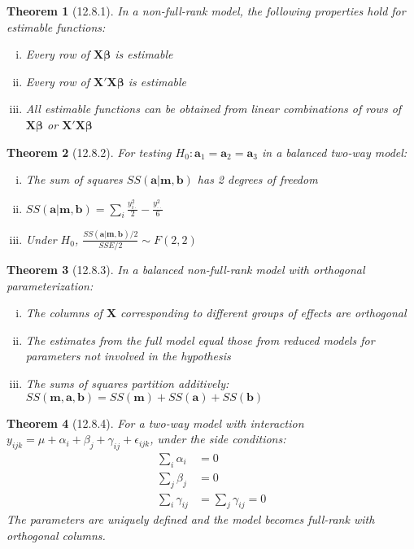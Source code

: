 \documentclass{article}
\newtheorem{theorem}{Theorem}[section]
\begin{document}
\begin{theorem}[12.8.1]
In a non-full-rank model, the following properties hold for estimable functions:
\begin{enumerate}[(i)]
\item Every row of $\mathbf{X}\boldsymbol{\beta}$ is estimable
\item Every row of $\mathbf{X}'\mathbf{X}\boldsymbol{\beta}$ is estimable
\item All estimable functions can be obtained from linear combinations of rows of $\mathbf{X}\boldsymbol{\beta}$ or $\mathbf{X}'\mathbf{X}\boldsymbol{\beta}$
\end{enumerate}
\end{theorem}

\begin{theorem}[12.8.2]
For testing $H_0: \mathbf{a}_1 = \mathbf{a}_2 = \mathbf{a}_3$ in a balanced two-way model:
\begin{enumerate}[(i)]
\item The sum of squares $SS(\mathbf{a}|\mathbf{m},\mathbf{b})$ has 2 degrees of freedom
\item $SS(\mathbf{a}|\mathbf{m},\mathbf{b}) = \sum_i \frac{y_{i\cdot}^2}{2} - \frac{y_{\cdot\cdot}^2}{6}$
\item Under $H_0$, $\frac{SS(\mathbf{a}|\mathbf{m},\mathbf{b})/2}{SSE/2} \sim F(2,2)$
\end{enumerate}
\end{theorem}

\begin{theorem}[12.8.3] 
In a balanced non-full-rank model with orthogonal parameterization:
\begin{enumerate}[(i)]
\item The columns of $\mathbf{X}$ corresponding to different groups of effects are orthogonal
\item The estimates from the full model equal those from reduced models for parameters not involved in the hypothesis
\item The sums of squares partition additively: $SS(\mathbf{m},\mathbf{a},\mathbf{b}) = SS(\mathbf{m}) + SS(\mathbf{a}) + SS(\mathbf{b})$
\end{enumerate}
\end{theorem}

\begin{theorem}[12.8.4]
For a two-way model with interaction $y_{ijk} = \mu + \alpha_i + \beta_j + \gamma_{ij} + \epsilon_{ijk}$, under the side conditions:
\begin{align*}
\sum_i \alpha_i &= 0\\
\sum_j \beta_j &= 0\\
\sum_i \gamma_{ij} &= \sum_j \gamma_{ij} = 0
\end{align*}
The parameters are uniquely defined and the model becomes full-rank with orthogonal columns.
\end{theorem}
\end{document}

